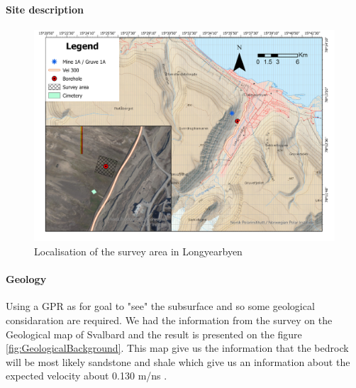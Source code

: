 \paragraph{Site description} \label{Paragraph:SiteDescription}


\begin{figure}
    \centering
    \includegraphics[width=\linewidth]{Images/00_Methodology/GeographicSituation.jpg}
    \caption{Localisation of the survey area in Longyearbyen}
    \label{fig:Location}
\end{figure}


\paragraph{Geology} Using a GPR as for goal to "see" the subsurface and so some geological considaration are required. We had the information from the survey on the Geological map of Svalbard \cite{Atakan2015GeoscienceSvalbard} and the result is presented on the figure \ref{fig:GeologicalBackground}. This map give us the information that the bedrock will be most likely sandstone and shale which give us an information about the expected velocity about 0.130 m/ns \cite{GPRAnalysis}.

